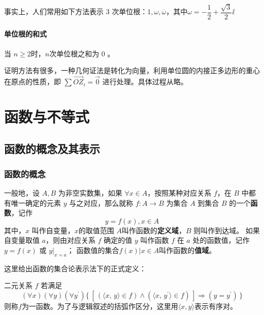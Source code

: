 \documentclass[a4paper,openany]{ctexbook}
\renewcommand{\vec}{\overrightarrow}
\begin{document}
事实上，人们常用如下方法表示 \(3\) 次单位根：\(1,\omega,\overline{\omega}\)，其中\(\omega=-\dfrac{1}{2}+\dfrac{\sqrt{3}}{2}\ii\)

\subsubsection{单位根的和式}

当 \(n \ge 2\)时，\(n\)次单位根之和为 \(0\) 。

证明方法有很多，一种几何证法是转化为向量，利用单位圆的内接正多边形的重心在原点的性质，即 \(\sum \vec{OZ}_i=\vec{0}\) 进行处理。具体过程从略。

\chapter{函数与不等式}

\section{函数的概念及其表示}

\subsection{函数的概念}

一般地，设 \(A,B\) 为非空实数集，如果 \(\forall x \in A\)，按照某种对应关系 \(f\)，在 \(B\) 中都有唯一确定的元素 \(y\) 与之对应，那么就称 \(f:A\rightarrow B\)
为集合 \(A\) 到集合 \(B\) 的一个\textbf{函数}，记作\[y=f(x),x\in A\]
其中，\(x\) 叫作自变量，\(x\)的取值范围 \(A\)叫作函数的\textbf{定义域}，\(B\) 则叫作到达域。
如果自变量取值 \(a\)，则由对应关系 \(f\) 确定的值 \(y\) 叫作函数 \(f\) 在 \(a\) 处的函数值，记作 \(y=f(x)\) 或 \(y |_{x=a}\)；
函数值的集合\({f(x)|x\in A}\)叫作函数的\textbf{值域}。

这里给出函数的集合论表示法下的正式定义：

二元关系 \(f\) 若满足
\[
    (\forall x)(\forall y)(\forall y^{\prime})
    \{\,
    [\,(\langle x,\,y \rangle \in f)
            \wedge
            (\langle x,\,y^{\prime}\rangle \in f)\,]
    \Rightarrow (y=y^{\prime})
    \,\}
\]
则称\(f\)为一函数。为了与逻辑叙述的括弧作区分，这里用\(\langle x,y \rangle\)表示有序对。
\end{document}
